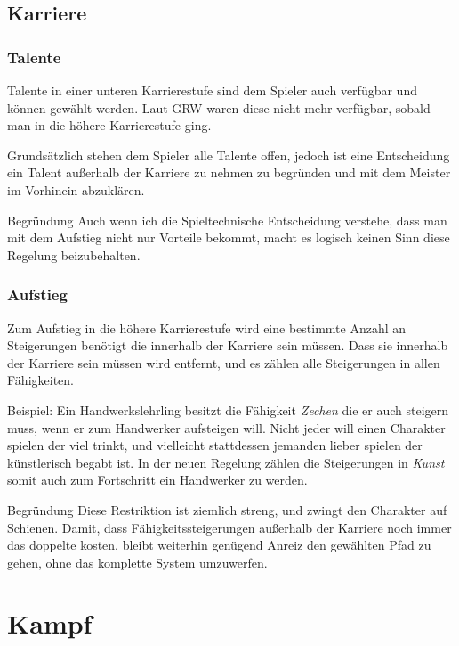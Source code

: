 \documentclass[a4paper]{article}
\begin{document}
\begin{multicols}{2}
\subsection{Karriere}
\subsubsection{Talente}
Talente in einer unteren Karrierestufe sind dem Spieler auch verfügbar und können gewählt werden. 
Laut GRW waren diese nicht mehr verfügbar, sobald man in die höhere Karrierestufe ging.

Grundsätzlich stehen dem Spieler alle Talente offen, jedoch ist eine Entscheidung ein Talent außerhalb der Karriere zu nehmen zu begründen und mit dem Meister im Vorhinein abzuklären.

\begin{DndComment}{Begründung}
  Auch wenn ich die Spieltechnische Entscheidung verstehe, dass man mit dem Aufstieg nicht nur Vorteile bekommt, macht es logisch keinen Sinn diese Regelung beizubehalten.
\end{DndComment}

\subsubsection{Aufstieg}
Zum Aufstieg in die höhere Karrierestufe wird eine bestimmte Anzahl an Steigerungen benötigt die innerhalb der Karriere sein müssen.
Dass sie innerhalb der Karriere sein müssen wird entfernt, und es zählen alle Steigerungen in allen Fähigkeiten.

Beispiel: Ein Handwerkslehrling besitzt die Fähigkeit \textit{Zechen} die er auch steigern muss, wenn er zum Handwerker aufsteigen will. Nicht jeder will einen Charakter spielen der viel trinkt, und vielleicht stattdessen jemanden lieber spielen der künstlerisch begabt ist. In der neuen Regelung zählen die Steigerungen in \textit{Kunst} somit auch zum Fortschritt ein Handwerker zu werden.

\begin{DndComment}{Begründung}
  Diese Restriktion ist ziemlich streng, und zwingt den Charakter auf Schienen. Damit, dass Fähigkeitssteigerungen außerhalb der Karriere noch immer das doppelte kosten, bleibt weiterhin genügend Anreiz den gewählten Pfad zu gehen, ohne das komplette System umzuwerfen.
\end{DndComment}

\newpage
\section{Kampf}


\end{multicols}
\end{document}
